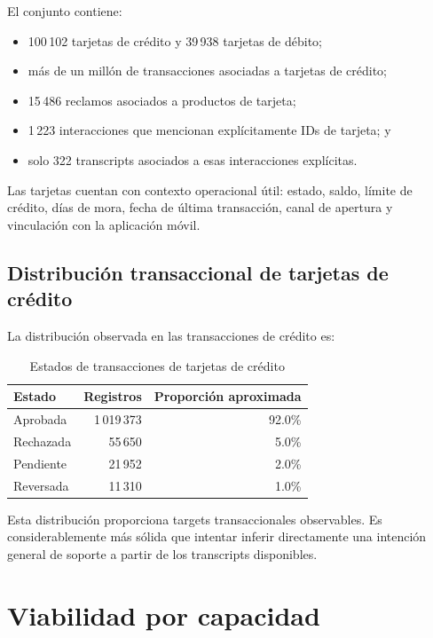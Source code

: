\documentclass[11pt,a4paper]{article}
\begin{document}
El conjunto contiene:

\begin{itemize}
  \item 100\,102 tarjetas de crédito y 39\,938 tarjetas de débito;
  \item más de un millón de transacciones asociadas a tarjetas de crédito;
  \item 15\,486 reclamos asociados a productos de tarjeta;
  \item 1\,223 interacciones que mencionan explícitamente IDs de tarjeta; y
  \item solo 322 transcripts asociados a esas interacciones explícitas.
\end{itemize}

Las tarjetas cuentan con contexto operacional útil: estado, saldo, límite de crédito, días de mora, fecha de última transacción, canal de apertura y vinculación con la aplicación móvil.

\subsection{Distribución transaccional de tarjetas de crédito}

La distribución observada en las transacciones de crédito es:

\begin{table}[ht]
\centering
\caption{Estados de transacciones de tarjetas de crédito}
\begin{tabular}{lrr}
\toprule
Estado & Registros & Proporción aproximada \\
\midrule
Aprobada & 1\,019\,373 & 92.0\% \\
Rechazada & 55\,650 & 5.0\% \\
Pendiente & 21\,952 & 2.0\% \\
Reversada & 11\,310 & 1.0\% \\
\bottomrule
\end{tabular}
\end{table}

Esta distribución proporciona targets transaccionales observables. Es considerablemente más sólida que intentar inferir directamente una intención general de soporte a partir de los transcripts disponibles.

\section{Viabilidad por capacidad}
\end{document}
